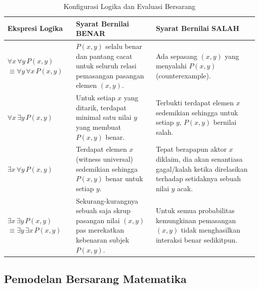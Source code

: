 \begin{table}[htbp]
\centering
\renewcommand{\arraystretch}{1.5}
\begin{tabular}{|p{3cm}|p{5.5cm}|p{5.5cm}|}
\hline
\textbf{Ekspresi Logika} & \textbf{Syarat Bernilai BENAR} & \textbf{Syarat Bernilai SALAH} \\ \hline

$\forall x \, \forall y \, P(x,y)$ 
\newline $\equiv \forall y \, \forall x \, P(x,y)$ & 
$P(x,y)$ selalu benar dan pantang cacat untuk seluruh relasi pemasangan pasangan elemen $(x, y)$. & 
Ada sepasang $(x,y)$ yang menyalahi $P(x,y)$ (counterexample). \\ \hline

$\forall x \, \exists y \, P(x,y)$ & 
Untuk setiap $x$ yang ditarik, terdapat minimal satu nilai $y$ yang membuat $P(x,y)$ benar. & 
Terbukti terdapat elemen $x$ sedemikian sehingga untuk setiap $y$, $P(x,y)$ bernilai salah. \\ \hline

$\exists x \, \forall y \, P(x,y)$ & 
Terdapat elemen $x$ (witness universal) sedemikian sehingga $P(x,y)$ benar untuk setiap $y$. & 
Tepat berapapun aktor $x$ diklaim, dia akan senantiasa gagal/kalah ketika direlasikan terhadap setidaknya sebuah nilai $y$ acak. \\ \hline

$\exists x \, \exists y \, P(x,y)$
\newline $\equiv \exists y \, \exists x \, P(x,y)$ & 
Sekurang-kurangnya sebuah saja skrup pasangan nilai $(x,y)$ pas merekatkan kebenaran subjek $P(x,y)$. & 
Untuk semua probabilitas kemungkinan pemasangan $(x,y)$ tidak menghasilkan interaksi benar sedikitpun. \\ \hline

\end{tabular}
\caption{Konfigurasi Logika dan Evaluasi Bersarang}
\end{table}

\subsection{Pemodelan Bersarang Matematika}

